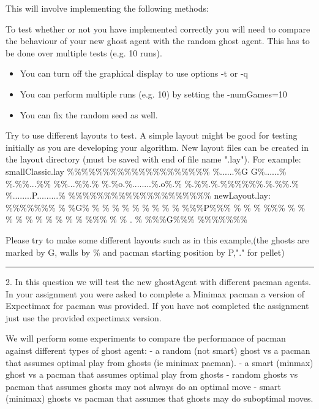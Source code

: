 \documentclass[11pt]{article}
\providecommand{\tightlist}{%
      \setlength{\itemsep}{0pt}\setlength{\parskip}{0pt}}
\begin{document}
This will involve implementing the following methods:

To test whether or not you have implemented correctly you will need to
compare the behaviour of your new ghost agent with the random ghost
agent. This has to be done over multiple tests (e.g. 10 runs).

\begin{itemize}
\tightlist
\item
  You can turn off the graphical display to use options -t or -q
\item
  You can perform multiple runs (e.g. 10) by setting the -numGames=10
\item
  You can fix the random seed as well.
\end{itemize}

Try to use different layouts to test. A simple layout might be good for
testing initially as you are developing your algorithm. New layout files
can be created in the layout directory (must be saved with end of file
name ".lay"). For example: smallClassic.lay
\%\%\%\%\%\%\%\%\%\%\%\%\%\%\%\%\%\%\%\% \%......\%G G\%......\%
\%.\%\%...\%\% \%\%...\%\%.\% \%.\%o.\%........\%.o\%.\%
\%.\%\%.\%.\%\%\%\%\%\%.\%.\%\%.\% \%........P.........\%
\%\%\%\%\%\%\%\%\%\%\%\%\%\%\%\%\%\%\%\% newLayout.lay: \%\%\%\%\%\%\%
\% \%G\% \% \% \% \% \% \% \% \% \% \%\%\%P\%\%\% \% \% \% \%\%\% \% \%
\% \% \% \% \% \% \% \% \%\%\% \% \% . \% \%\%\%G\%\%\% \%\%\%\%\%\%\%

Please try to make some different layouts such as in this example,(the
ghosts are marked by G, walls by \% and pacman starting position by
P,"." for pellet)

\begin{center}\rule{0.5\linewidth}{\linethickness}\end{center}

2. In this question we will test the new ghostAgent with different
pacman agents. In your assignment you were asked to complete a Minimax
pacman a version of Expectimax for pacman was provided. If you have not
completed the assignment just use the provided expectimax version.

We will perform some experiments to compare the performance of pacman
against different types of ghost agent: - a random (not smart) ghost vs
a pacman that assumes optimal play from ghosts (ie minimax pacman). - a
smart (minmax) ghost vs a pacman that assumes optimal play from ghosts -
random ghosts vs pacman that assumes ghosts may not always do an optimal
move - smart (minimax) ghosts vs pacman that assumes that ghosts may do
suboptimal moves.
\end{document}
